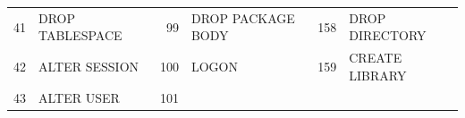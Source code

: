 \begin{appendix}
\begin{longtable}[]{@{}rl|rl|rl@{}}
\begin{minipage}[t]{0.06\columnwidth}\raggedright\strut
41\strut
\end{minipage} & \begin{minipage}[t]{0.19\columnwidth}\raggedright\strut
DROP TABLESPACE\strut
\end{minipage} & \begin{minipage}[t]{0.06\columnwidth}\raggedright\strut
99\strut
\end{minipage} & \begin{minipage}[t]{0.24\columnwidth}\raggedright\strut
DROP PACKAGE BODY\strut
\end{minipage} & \begin{minipage}[t]{0.06\columnwidth}\raggedright\strut
158\strut
\end{minipage} & \begin{minipage}[t]{0.24\columnwidth}\raggedright\strut
DROP DIRECTORY\strut
\end{minipage}\tabularnewline
\begin{minipage}[t]{0.06\columnwidth}\raggedright\strut
42\strut
\end{minipage} & \begin{minipage}[t]{0.19\columnwidth}\raggedright\strut
ALTER SESSION\strut
\end{minipage} & \begin{minipage}[t]{0.06\columnwidth}\raggedright\strut
100\strut
\end{minipage} & \begin{minipage}[t]{0.24\columnwidth}\raggedright\strut
LOGON\strut
\end{minipage} & \begin{minipage}[t]{0.06\columnwidth}\raggedright\strut
159\strut
\end{minipage} & \begin{minipage}[t]{0.24\columnwidth}\raggedright\strut
CREATE LIBRARY\strut
\end{minipage}\tabularnewline
\begin{minipage}[t]{0.06\columnwidth}\raggedright\strut
43\strut
\end{minipage} & \begin{minipage}[t]{0.19\columnwidth}\raggedright\strut
ALTER USER\strut
\end{minipage} & \begin{minipage}[t]{0.06\columnwidth}\raggedright\strut
101\strut
\end{minipage} & \begin{minipage}[t]{0.24\columnwidth}\raggedright\strut

\end{minipage}
\end{longtable}
\end{appendix}
